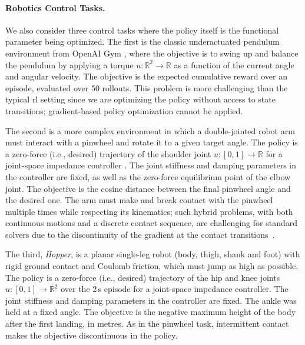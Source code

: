 \documentclass{article}
\newcommand{\R}{\mathbb{R}}
\newcommand{\vu}{u}
\begin{document}
\paragraph{Robotics Control Tasks.}
We also consider three control tasks where the policy itself is the functional parameter being optimized. The first is the classic underactuated pendulum environment from OpenAI Gym \citep{brockman2016openai}, where the objective is to swing up and balance the pendulum by applying a torque $\vu:\R^2\to\R$ as a function of the current angle and angular velocity. The objective is the expected cumulative reward over an episode, evaluated over 50 rollouts.
This problem is more challenging than the typical \gls{rl} setting since we are optimizing the policy without access to state transitions; gradient-based policy optimization cannot be applied.

The second is a more complex environment in which a double-jointed robot arm must interact with a pinwheel and rotate it to a given target angle. The policy is a zero-force (i.e., desired) trajectory of the shoulder joint $\vu:[0,1]\to\mathbb{R}$ for a joint-space impedance controller \cite{hermus2021exploiting}. The joint stiffness and damping parameters in the controller are fixed, as well as the zero-force equilibrium point of the elbow joint. 
The objective is the cosine distance between the final pinwheel angle and the desired one.
The arm must make and break contact with the pinwheel multiple times while respecting its kinematics; such hybrid problems, with both continuous motions and a discrete contact sequence, are challenging for standard solvers due to the discontinuity of the gradient at the contact transitions~\cite{posa2014direct}.

The third, \emph{Hopper}, is a planar single-leg robot (body, thigh, shank and foot) with rigid ground contact and Coulomb friction, which must jump as high as possible. The policy is a zero-force (i.e., desired) trajectory of the hip and knee joints $\vu:[0,1]\to\R^2$ over the $2$\,s episode for a joint-space impedance controller. The joint stiffness and damping parameters in the controller are fixed. The ankle was held at a fixed angle.
The objective is the negative maximum height of the body after the first landing, in metres.
As in the pinwheel task, intermittent contact makes the objective discontinuous in the policy.
\end{document}
